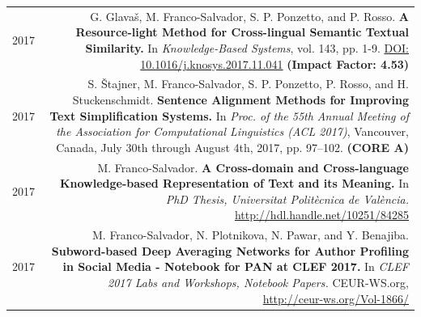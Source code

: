 \documentclass[10pt]{article}
\begin{document}
\begin{tabular}{L!{\VRule}R}
	2017 & G. Glava{\v s}, M. Franco-Salvador, S. P. Ponzetto, and P. Rosso. \textbf{A Resource-light Method for Cross-lingual Semantic Textual Similarity.}
	In \emph{Knowledge-Based Systems}, vol. 143, pp. 1-9. \href{https://doi.org/10.1016/j.knosys.2017.11.041}{DOI: 10.1016/j.knosys.2017.11.041} \textbf{(Impact Factor: 4.53)} \vspace{5pt}\\	
	2017& S. \v{S}tajner, M. Franco-Salvador, S. P. Ponzetto, P. Rosso, and H. Stuckenschmidt. \textbf{Sentence Alignment Methods for Improving Text Simplification Systems.}
	In \emph{Proc. of the 55th Annual Meeting of the Association for Computational Linguistics (ACL 2017)},  Vancouver, Canada, July 30th through August 4th, 2017, pp. 97--102. \textbf{(CORE A)}\vspace{5pt}\\
	2017& M. Franco-Salvador. \textbf{A Cross-domain and Cross-language Knowledge-based Representation of Text and its Meaning.}
	In \emph{PhD Thesis, Universitat Polit{\`e}cnica de Val{\`e}ncia.} \href{http://hdl.handle.net/10251/84285}{http://hdl.handle.net/10251/84285}\vspace{5pt}\\
	2017& M. Franco-Salvador, N. Plotnikova, N. Pawar, and Y. Benajiba. \textbf{Subword-based Deep Averaging Networks for Author Profiling in Social Media - Notebook for PAN at CLEF 2017.}
	In \emph{CLEF 2017 Labs and Workshops, Notebook Papers.} CEUR-WS.org, \href{http://ceur-ws.org/Vol-1866/}{http://ceur-ws.org/Vol-1866/} \vspace{5pt}\\
\end{tabular}
\end{document}
